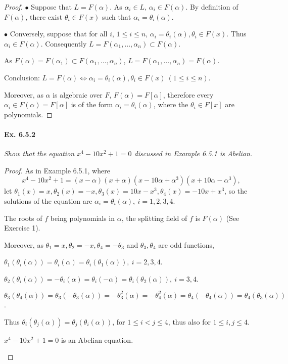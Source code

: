 \documentclass[11pt,a4paper]{article}
\begin{document}
\begin{proof}

$\bullet$ Suppose that $L=F(\alpha)$. As $\alpha_i \in L$, $\alpha_i \in F(\alpha)$. By definition of $F(\alpha)$, there exist $\theta_i \in F(x)$ such that $\alpha_i = \theta_i(\alpha)$.

$\bullet$ Conversely, suppose that for all $i$, $1\leq i \leq n$, $\alpha_i = \theta_i(\alpha), \theta_i \in F(x)$.
Thus $\alpha_i\in F(\alpha)$. Consequently $L=F(\alpha_1,\ldots,\alpha_n)\subset F(\alpha)$. 

As $F(\alpha) = F(\alpha_1)\subset F(\alpha_1,\ldots,\alpha_n)$, $L =F(\alpha_1,\ldots,\alpha_n) = F(\alpha)$.

Conclusion: $L=F(\alpha) \iff \alpha_i = \theta_i(\alpha), \theta_i \in F(x)\  (1\leq i \leq n)$.

Moreover, as $\alpha$ is algebraic over $F$, $F(\alpha) = F[\alpha]$, therefore every $\alpha_i \in F(\alpha) = F[\alpha]$ is of the form $\alpha_i = \theta_i(\alpha)$, where the $\theta_i \in F[x]$ are polynomials.
\end{proof}

\paragraph{Ex. 6.5.2}

{\it Show that the equation $x^4-10x^2+1 = 0$ discussed in Example 6.5.1 is Abelian.
}

\begin{proof}
As in Example 6.5.1, where
$$x^4 - 10x^2 + 1 = (x-\alpha)(x+\alpha)(x-10\alpha + \alpha^3)(x+10\alpha - \alpha^3),$$
let $\theta_1(x) = x, \theta_2(x) = -x, \theta_3(x) = 10x-x^3,\theta_4(x) = -10x+x^3$, so the solutions of the equation are $\alpha_i = \theta_i(\alpha), \ i=1,2,3,4$.

The roots of $f$ being polynomials in $\alpha$, the splitting field of $f$ is $F(\alpha)$ (See  Exercise 1).

Moreover, as $\theta_1 = x, \theta_2 = -x, \theta_4 = -\theta_3$ and $\theta_3,\theta_4$ are odd functions,

 $\theta_1(\theta_i(\alpha)) = \theta_i(\alpha) = \theta_i(\theta_1(\alpha)),\ i=2,3,4$.

$\theta_2(\theta_i(\alpha)) = - \theta_i(\alpha) = \theta_i(-\alpha) = \theta_i(\theta_2(\alpha)),\ i=3,4$.

$\theta_3(\theta_4(\alpha)) = \theta_3(-\theta_3(\alpha)) = -\theta_3^2(\alpha) = -\theta_4^2(\alpha) = \theta_4(-\theta_4(\alpha)) = \theta_4(\theta_3(\alpha))$.

Thus $\theta_i(\theta_j(\alpha)) = \theta_j(\theta_i(\alpha))$, for $1\leq i <j\leq 4$, thus also for $1\leq i,j\leq 4$.
\begin{center}
$x^4-10x^2+1 = 0$ is an Abelian equation.
\end{center}
\end{proof}
\end{document}
